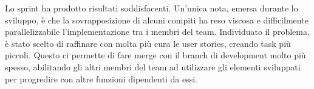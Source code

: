 Lo sprint ha prodotto risultati soddisfacenti. Un'unica nota, emersa durante lo sviluppo, è che la sovrapposizione di alcuni compiti ha reso viscosa e difficilmente parallelizzabile l'implementazione tra i membri del team. Individuato il problema, è stato scelto di raffinare con molta più cura le user stories, creando task più piccoli. Questo ci permette di fare merge con il branch di development molto più spesso, abilitando gli altri membri del team ad utilizzare gli elementi sviluppati per progredire con altre funzioni dipendenti da essi.